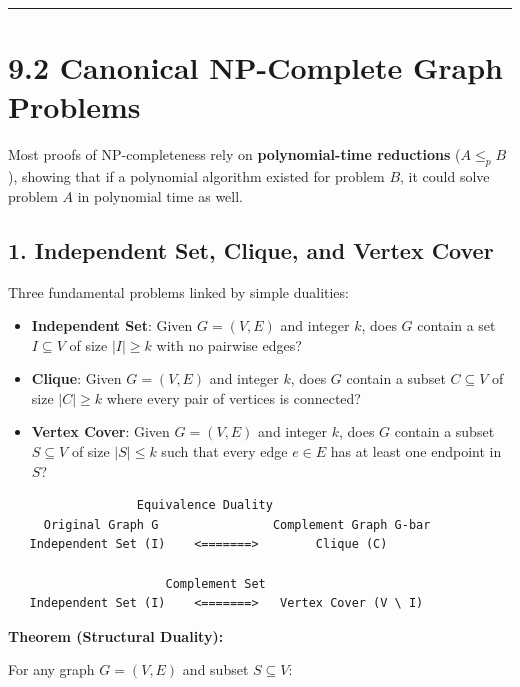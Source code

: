\documentclass[
]{book}
\providecommand{\tightlist}{%
  \setlength{\itemsep}{0pt}\setlength{\parskip}{0pt}}
\theoremstyle{definition}
\theoremstyle{definition}
\theoremstyle{definition}
\theoremstyle{definition}
\theoremstyle{remark}
\begin{document}
\begin{center}\rule{0.5\linewidth}{0.5pt}\end{center}

\section{9.2 Canonical NP-Complete Graph Problems}\label{canonical-np-complete-graph-problems}

Most proofs of NP-completeness rely on \textbf{polynomial-time reductions} (\(A \le_p B\)), showing that if a polynomial algorithm existed for problem \(B\), it could solve problem \(A\) in polynomial time as well.

\subsection{1. Independent Set, Clique, and Vertex Cover}\label{independent-set-clique-and-vertex-cover}

Three fundamental problems linked by simple dualities:

\begin{itemize}
\tightlist
\item
  \textbf{Independent Set}: Given \(G = (V, E)\) and integer \(k\), does \(G\) contain a set \(I \subseteq V\) of size \(\vert{}I\vert{} \ge k\) with no pairwise edges?
\item
  \textbf{Clique}: Given \(G = (V, E)\) and integer \(k\), does \(G\) contain a subset \(C \subseteq V\) of size \(\vert{}C\vert{} \ge k\) where every pair of vertices is connected?
\item
  \textbf{Vertex Cover}: Given \(G = (V, E)\) and integer \(k\), does \(G\) contain a subset \(S \subseteq V\) of size \(\vert{}S\vert{} \le k\) such that every edge \(e \in E\) has at least one endpoint in \(S\)?
\end{itemize}

\begin{verbatim}
                  Equivalence Duality
     Original Graph G                Complement Graph G-bar
   Independent Set (I)    <=======>        Clique (C)
   
                      Complement Set
   Independent Set (I)    <=======>   Vertex Cover (V \ I)
\end{verbatim}

\textbf{Theorem (Structural Duality):}

For any graph \(G = (V, E)\) and subset \(S \subseteq V\):
\end{document}
